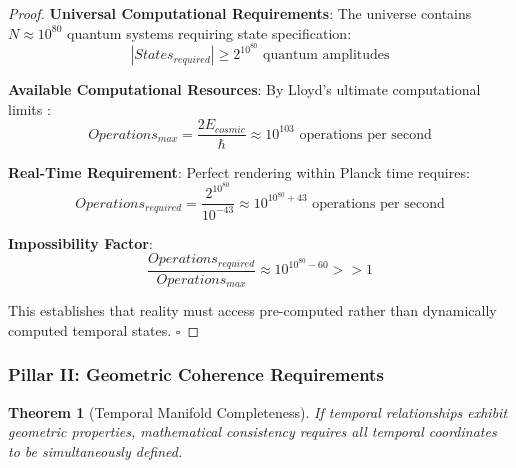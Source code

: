 \documentclass[11pt,a4paper]{article}
\newtheorem{theorem}{Theorem}[section]
\theoremstyle{remark}
\begin{document}
\begin{proof}
\textbf{Universal Computational Requirements}: The universe contains $N \approx 10^{80}$ quantum systems requiring state specification:
\begin{equation}
|States_{required}| \geq 2^{10^{80}} \text{ quantum amplitudes}
\end{equation}

\textbf{Available Computational Resources}: By Lloyd's ultimate computational limits \cite{lloyd2000ultimate}:
\begin{equation}
Operations_{max} = \frac{2E_{cosmic}}{\hbar} \approx 10^{103} \text{ operations per second}
\end{equation}

\textbf{Real-Time Requirement}: Perfect rendering within Planck time requires:
\begin{equation}
Operations_{required} = \frac{2^{10^{80}}}{10^{-43}} \approx 10^{10^{80}+43} \text{ operations per second}
\end{equation}

\textbf{Impossibility Factor}:
\begin{equation}
\frac{Operations_{required}}{Operations_{max}} \approx 10^{10^{80}-60} >> 1
\end{equation}

This establishes that reality must access pre-computed rather than dynamically computed temporal states. $\square$
\end{proof}

\subsubsection{Pillar II: Geometric Coherence Requirements}

\begin{theorem}[Temporal Manifold Completeness]
If temporal relationships exhibit geometric properties, mathematical consistency requires all temporal coordinates to be simultaneously defined.
\end{theorem}
\end{document}
